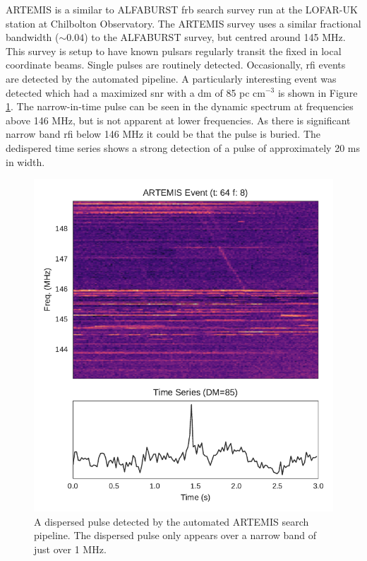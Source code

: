 \documentclass[a4paper,fleqn,usenatbib]{mnras}
\begin{document}
ARTEMIS \citep{2015MNRAS.452.1254K} is a similar to ALFABURST \gls{frb} search
survey run at the LOFAR-UK station at Chilbolton Observatory. The ARTEMIS survey
uses a similar fractional bandwidth ($\sim 0.04$) to the ALFABURST survey, but
centred around 145 MHz. This survey is setup to have known pulsars regularly
transit the fixed in local coordinate beams. Single pulses are routinely
detected. Occasionally, \gls{rfi} events are detected by the automated pipeline. 
A particularly interesting event was detected which had a maximized \gls{snr}
with a \gls{dm} of 85 pc cm$^{-3}$ is shown in Figure \ref{fig:lofar_dynamic}. The
narrow-in-time pulse can be seen in the dynamic spectrum at frequencies above
146 MHz, but is not apparent at lower frequencies. As there is significant
narrow band \gls{rfi} below 146 MHz it could be that the pulse is buried. The
dedispered time series shows a strong detection of a pulse of approximately 20
ms in width.

\begin{figure}
    \includegraphics[width=1.0\linewidth]{figures/LOFAR_dynamic.pdf}
    \caption{A dispersed pulse detected by the automated ARTEMIS search
    pipeline. The dispersed pulse only appears over a narrow band of just over 1
    MHz.
    }
    \label{fig:lofar_dynamic}
\end{figure}
\end{document}
